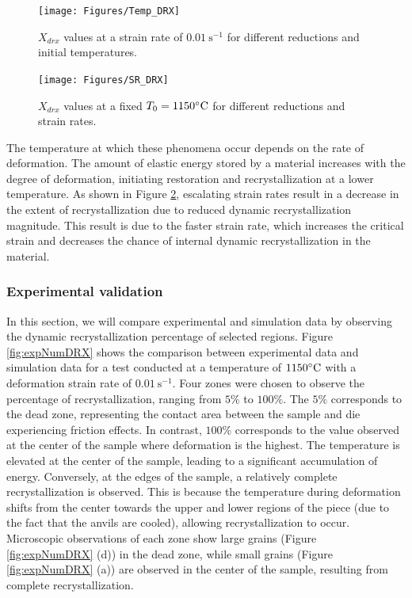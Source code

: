 \documentclass[metals,article,submit,pdftex,moreauthors]{Definitions/mdpi}
\DeclareRobustCommand{\ps}{\text{s}^{-1}}
\begin{document}
\begin{figure}[H]
\centering
\texttt{[image: Figures/Temp\_DRX]}
\caption{$X_{drx}$ values at a strain rate of $0.01~\ps$ for different reductions and initial temperatures.}
\label{fig:TempEffect}
\end{figure}
\begin{figure}[H]
\centering
\texttt{[image: Figures/SR\_DRX]}
\caption{$X_{drx}$ values at a fixed $T_0=1150\celsius$ for different reductions and strain rates.}
\label{fig:SREffect}
\end{figure}

The temperature at which these phenomena occur depends on the rate of deformation.
The amount of elastic energy stored by a material increases with the degree of deformation, initiating restoration and recrystallization at a lower temperature.
As shown in Figure \ref{fig:SREffect}, escalating strain rates result in a decrease in the extent of recrystallization due to reduced dynamic recrystallization magnitude.
This result is due to the faster strain rate, which increases the critical strain and decreases the chance of internal dynamic recrystallization in the material.

\subsubsection{Experimental validation \label{subsec:ExpValid}}

In this section, we will compare experimental and simulation data by observing the dynamic recrystallization percentage of selected regions.
Figure \ref{fig:expNumDRX} shows the comparison between experimental data and simulation data for a test conducted at a temperature of $1150\celsius$ with a deformation strain rate of $0.01~\ps$.
Four zones were chosen to observe the percentage of recrystallization, ranging from $5\%$ to $100\%$.
The $5\%$ corresponds to the dead zone, representing the contact area between the sample and die experiencing friction effects.
In contrast, $100\%$ corresponds to the value observed at the center of the sample where deformation is the highest.
The temperature is elevated at the center of the sample, leading to a significant accumulation of energy.
Conversely, at the edges of the sample, a relatively complete recrystallization is observed.
This is because the temperature during deformation shifts from the center towards the upper and lower regions of the piece (due to the fact that the anvils are cooled), allowing recrystallization to occur.
Microscopic observations of each zone show large grains (Figure \ref{fig:expNumDRX} (d)) in the dead zone, while small grains (Figure \ref{fig:expNumDRX} (a)) are observed in the center of the sample, resulting from complete recrystallization.
\end{document}
